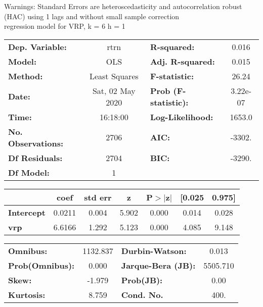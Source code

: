 Warnings: \newline
 [1] Standard Errors are heteroscedasticity and autocorrelation robust (HAC) using 1 lags and without small sample correction\\ 

regression model for VRP, k = 6 h = 1\begin{center}
\begin{tabular}{lclc}
\toprule
\textbf{Dep. Variable:}    &       rtrn       & \textbf{  R-squared:         } &     0.016   \\
\textbf{Model:}            &       OLS        & \textbf{  Adj. R-squared:    } &     0.015   \\
\textbf{Method:}           &  Least Squares   & \textbf{  F-statistic:       } &     26.24   \\
\textbf{Date:}             & Sat, 02 May 2020 & \textbf{  Prob (F-statistic):} &  3.22e-07   \\
\textbf{Time:}             &     16:18:00     & \textbf{  Log-Likelihood:    } &    1653.0   \\
\textbf{No. Observations:} &        2706      & \textbf{  AIC:               } &    -3302.   \\
\textbf{Df Residuals:}     &        2704      & \textbf{  BIC:               } &    -3290.   \\
\textbf{Df Model:}         &           1      & \textbf{                     } &             \\
\bottomrule
\end{tabular}
\begin{tabular}{lcccccc}
                   & \textbf{coef} & \textbf{std err} & \textbf{z} & \textbf{P$> |$z$|$} & \textbf{[0.025} & \textbf{0.975]}  \\
\midrule
\textbf{Intercept} &       0.0211  &        0.004     &     5.902  &         0.000        &        0.014    &        0.028     \\
\textbf{vrp}       &       6.6166  &        1.292     &     5.123  &         0.000        &        4.085    &        9.148     \\
\bottomrule
\end{tabular}
\begin{tabular}{lclc}
\textbf{Omnibus:}       & 1132.837 & \textbf{  Durbin-Watson:     } &    0.013  \\
\textbf{Prob(Omnibus):} &   0.000  & \textbf{  Jarque-Bera (JB):  } & 5505.710  \\
\textbf{Skew:}          &  -1.979  & \textbf{  Prob(JB):          } &     0.00  \\
\textbf{Kurtosis:}      &   8.759  & \textbf{  Cond. No.          } &     400.  \\
\bottomrule
\end{tabular}
\end{center}

